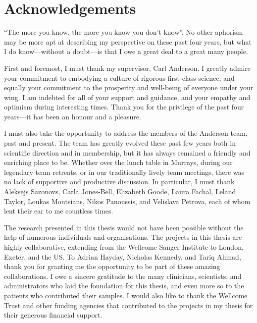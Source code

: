 %
%

\chapter{Acknowledgements}

\enquote{The more you know, the more you know you don't know}.
No other aphorism may be more apt at describing my perspective on these past four years,
but what I do know---without a doubt---is that I owe a great deal to a great many people.

First and foremost, I must thank my supervisor, Carl Anderson.
I greatly admire your commitment to embodying a culture of rigorous first-class science,
and equally your commitment to the prosperity and well-being of everyone under your wing. 
I am indebted for all of your support and guidance, 
and your empathy and optimism during interesting times.
Thank you for the privilege of the past four years---it has been an honour and a pleasure.

I must also take the opportunity to address the members of the Anderson team, past and present.
The team has greatly evolved these past few years both in scientific direction and in membership,
but it has always remained a friendly and enriching place to be. 
Whether over the lunch table in Murrays,
during our legendary team retreats,
or in our traditionally lively team meetings,
there was no lack of supportive and productive discussion.
In particular, I must thank
    Aleksejs Sazonovs,
    Carla Jones-Bell,
    Elizabeth Goode,
    Laura Fachal,
    Leland Taylor,
    Loukas Moutsians, 
    Nikos Panoussis,
    and Velislava Petrova,
    each of whom lent their ear to me countless times.

The research presented in this thesis would not have been possible without the help of numerous individuals and organisations.
The projects in this thesis are highly collaborative, extending from the Wellcome Sanger Institute to London, Exeter, and the US.
To Adrian Hayday, Nicholas Kennedy, and Tariq Ahmad, thank you for granting me the opportunity to be part of these amazing collaborations.
I owe a sincere gratitude to the many clinicians, scientists, and administrators who laid the foundation for this thesis,
and even more so to the patients who contributed their samples.
I would also like to thank the Wellcome Trust and other funding agencies that contributed to the projects in my thesis for their generous financial support.

